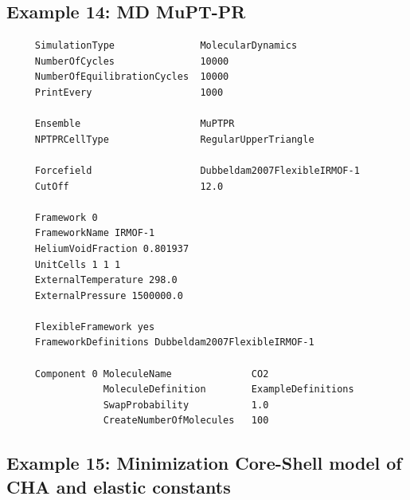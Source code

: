 \subsection*{Example 14: MD MuPT-PR}

\begin{tiny}
\begin{verbatim}
     SimulationType               MolecularDynamics
     NumberOfCycles               10000
     NumberOfEquilibrationCycles  10000
     PrintEvery                   1000
     
     Ensemble                     MuPTPR
     NPTPRCellType                RegularUpperTriangle
     
     Forcefield                   Dubbeldam2007FlexibleIRMOF-1
     CutOff                       12.0
     
     Framework 0
     FrameworkName IRMOF-1
     HeliumVoidFraction 0.801937
     UnitCells 1 1 1
     ExternalTemperature 298.0
     ExternalPressure 1500000.0
     
     FlexibleFramework yes
     FrameworkDefinitions Dubbeldam2007FlexibleIRMOF-1
     
     Component 0 MoleculeName              CO2
                 MoleculeDefinition        ExampleDefinitions
                 SwapProbability           1.0
                 CreateNumberOfMolecules   100
\end{verbatim}
\end{tiny}

\subsection*{Example 15: Minimization Core-Shell model of CHA and elastic constants}

